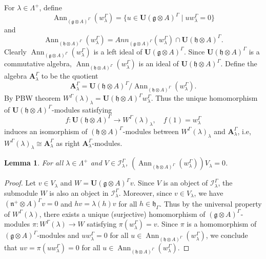 \documentclass[11pt]{amsart}
\theoremstyle{plain}
\newtheorem{lemma}[thm]{Lemma}
\theoremstyle{definition}
\newcommand{\g}{\mathfrak{g}}
\newcommand{\h}{\mathfrak{h}}
\newcommand{\n}{\mathfrak{n}}
\newcommand{\A}{\mathbf{A}_{\lambda}^{\Gamma}}
\DeclareMathOperator{\Ann}{Ann}
\begin{document}
For $\lambda\in \Lambda^+$, define 
\begin{equation*}
    \Ann_{(\g\otimes A)^\Gamma}(w_{\lambda}^{\Gamma})=\{u\in\mathbf{U}(\g\otimes A)^\Gamma\mid uw_{\lambda}^{\Gamma}=0\}
\end{equation*} and
\begin{equation*}
     \Ann_{(\h\otimes A)^\Gamma}(w_{\lambda}^{\Gamma})=Ann_{(\g\otimes A)^\Gamma}(w_{\lambda}^{\Gamma})\cap\mathbf{U}(\h\otimes A)^\Gamma.
\end{equation*}
Clearly $\Ann_{(\g\otimes A)^\Gamma}(w_{\lambda}^{\Gamma})$ is a left ideal of $\mathbf{U}(\g\otimes A)^\Gamma$. Since $\mathbf{U}(\h\otimes A)^\Gamma$ is a commutative algebra, $\Ann_{(\h\otimes A)^\Gamma}(w_{\lambda}^{\Gamma})$ is an ideal of $\mathbf{U}(\h\otimes A)^\Gamma$. Define the algebra $\A$ to be the quotient
\begin{equation}\label{eq:11}
    \A=\mathbf{U}(\h\otimes A)^\Gamma/\Ann_{(\h\otimes A)^\Gamma}(w_{\lambda}^{\Gamma}).
\end{equation}
By PBW theorem $W^\Gamma(\lambda)_\lambda=\mathbf{U}(\h\otimes A)^\Gamma w_{\lambda}^{\Gamma}$. Thus the unique homomorphism of $\mathbf{U}(\h\otimes A)^\Gamma$-modules satisfying
\begin{equation*}
     f:\mathbf{U}(\h\otimes A)^\Gamma\longrightarrow W^\Gamma(\lambda)_\lambda, \quad f(1)=w_{\lambda}^{\Gamma}
\end{equation*}
induces an isomorphism of $(\h\otimes A)^{\Gamma}$-modules between $W^\Gamma(\lambda)_\lambda$ and $\A$, i.e, $W^\Gamma(\lambda)_\lambda\cong\A$ as right $\A$-modules.
\begin{lemma}\label{lem:8}
    For all $\lambda\in \Lambda^+$ and $V\in \mathcal{I}^{\Gamma}_{\lambda}$, $(\Ann_{(\h\otimes A)^\Gamma}(w_{\lambda}^{\Gamma}))V_\lambda=0$. 
\end{lemma}
\begin{proof}
    Let $v\in V_\lambda$ and $W=\mathbf{U}(\g\otimes A)^{\Gamma}v$. Since $V$ is an object of $\mathcal{I}^{\Gamma}_{\lambda}$, the submodule $W$ is also an object in $\mathcal{I}^{\Gamma}_{\lambda}$. Moreover, since $v\in V_\lambda$, we have $(\n^+\otimes A)^{\Gamma}v=0$ and $hv=\lambda(h)v$ for all $h\in\h_{\Gamma}$. Thus by the universal property of $W^{\Gamma}(\lambda)$, there exists a unique (surjective) homomorphism of $(\g\otimes A)^{\Gamma}$-modules $\pi:W^{\Gamma}(\lambda)\rightarrow W$ satisfying $\pi(w_{\lambda}^{\Gamma})=v$. Since $\pi$ is a homomorphism of $(\g\otimes A)^{\Gamma}$-modules and $uw_{\lambda}^{\Gamma}=0$ for all $u\in \Ann_{(\h\otimes A)^\Gamma}(w_{\lambda}^{\Gamma})$, we conclude that $uv=\pi(uw_{\lambda}^{\Gamma})=0$ for all $u\in \Ann_{(\h\otimes A)^\Gamma}(w_{\lambda}^{\Gamma})$.
\end{proof}
\end{document}
